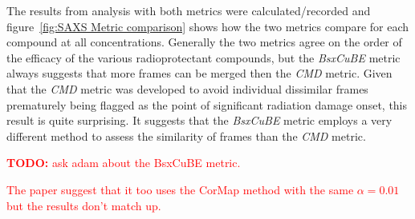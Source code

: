 The results from analysis with both metrics were calculated/recorded and figure~\ref{fig:SAXS Metric comparison} shows how the two metrics compare for each compound at all concentrations.
Generally the two metrics agree on the order of the efficacy of the various radioprotectant compounds, but the \textit{BsxCuBE} metric always suggests that more frames can be merged then the \textit{CMD} metric.
Given that the \textit{CMD} metric was developed to avoid individual dissimilar frames prematurely being flagged as the point of significant radiation damage onset, this result is quite surprising.
It suggests that the \textit{BsxCuBE} metric employs a very different method to assess the similarity of frames than the \textit{CMD} metric.
\textcolor{red}{
    \begin{myenumerate}
        \item \hypertarget{todo:Ask Adam about BsxCuBE}{\textbf{TODO:} ask adam about the BsxCuBE metric.}
        The paper suggest that it too uses the CorMap method with the same $\alpha = 0.01$ but the results don't match up.
    \end{myenumerate}
}
